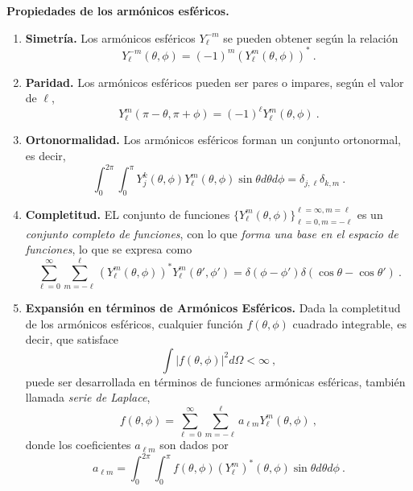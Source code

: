 \begin{propiedad}
    \textbf{Propiedades de los armónicos esféricos.}

    \begin{enumerate}
        \item \textbf{Simetría.} Los armónicos esféricos $Y_\ell^{-m}$ se pueden obtener según la relación
        \begin{equation}
            Y_\ell^{-m}(\theta, \phi) = (-1)^m (Y_\ell^m (\theta, \phi))^\ast \ .
        \end{equation}
    
        \item \textbf{Paridad.} Los armónicos esféricos pueden ser pares o impares, según el valor de $\ell$,
        \begin{equation}
            Y_\ell^m(\pi - \theta, \pi + \phi) = (-1)^\ell Y_\ell^m(\theta, \phi) \ .
        \end{equation}
    
        \item \textbf{Ortonormalidad.} Los armónicos esféricos forman un conjunto ortonormal, es decir,
        \begin{equation}
            \int_0^{2\pi} \int_0^\pi Y_j^k(\theta, \phi) Y_\ell^m (\theta, \phi) \sin\theta d\theta d\phi = \delta_{j, \ell} \delta_{k, m} \ .
        \end{equation}
    
        \item \textbf{Completitud.} EL conjunto de funciones $\{ Y_\ell^m(\theta, \phi) \}_{\ell = 0, m = -\ell}^{\ell = \infty, m = \ell}$ es un \emph{conjunto completo de funciones}, con lo que \emph{forma una base en el espacio de funciones}, lo que se expresa como
        \begin{equation}
            \sum_{\ell = 0}^{\infty} \sum_{m = -\ell}^{\ell} (Y_\ell^m (\theta, \phi))^\ast Y_{\ell}^m (\theta', \phi') = \delta(\phi - \phi') \delta(\cos\theta - \cos\theta') \ .
        \end{equation}
        
        \item \textbf{Expansión en términos de Armónicos Esféricos.} Dada la completitud de los armónicos esféricos, cualquier función $f(\theta, \phi)$ cuadrado integrable, es decir, que satisface
        \begin{equation}
            \int | f(\theta, \phi) |^2 d\Omega < \infty \ ,
        \end{equation}
        puede ser desarrollada en términos de funciones armónicas esféricas, también llamada \emph{serie de Laplace},
        \begin{equation}
            f(\theta, \phi) = \sum_{\ell = 0}^{\infty} \sum_{m = -\ell}^{\ell} a_{\ell m} Y_\ell^m (\theta, \phi) \ ,
        \end{equation}
        donde los coeficientes $a_{\ell m}$ son dados por
        \begin{equation}
            a_{\ell m} = \int_{0}^{2\pi} \int_{0}^{\pi} f(\theta, \phi) (Y_\ell^m)^\ast (\theta, \phi) \sin\theta d\theta d\phi \ .
        \end{equation}
    

\end{enumerate}
\end{propiedad}

